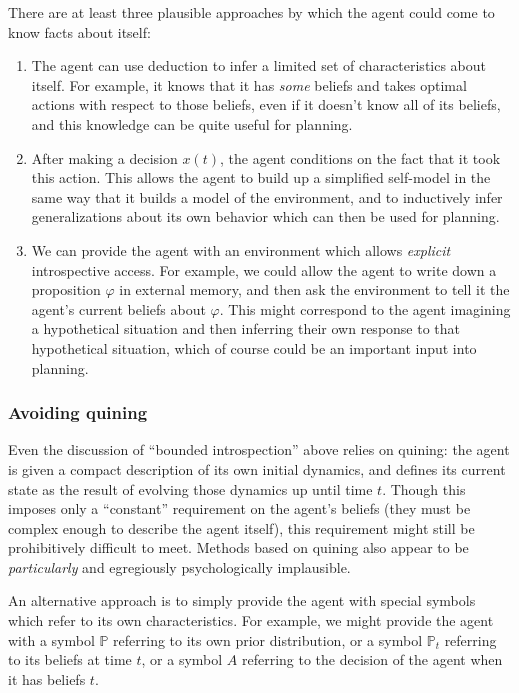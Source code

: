 \documentclass[12pt]{article}
\theoremstyle{definition}
\newcommand{\PP}{\mathbb{P}}
\newcommand{\vp}{\varphi}
\begin{document}
There are at least three plausible approaches by which the agent could come to know 
facts about itself:
\begin{enumerate}
\item The agent can use deduction to infer a limited set of characteristics
about itself. For example, it knows that it has \emph{some} beliefs
and takes optimal actions with respect to those beliefs, even if it doesn't
know all of its beliefs, and this knowledge can be quite useful for planning.
\item After making a decision $x(t)$, the agent conditions
on the fact that it took this action.
This allows the agent to build up a simplified self-model in the same way
that it builds a model of the environment,
and to inductively infer generalizations about its own behavior
which can then be used for planning.
\item We can provide the agent with an environment
which allows \emph{explicit} introspective access.
For example, we could allow the agent to write down a proposition $\vp$
in external memory, and then ask the environment to tell it
the agent's current beliefs about $\vp$.
This might correspond to the agent imagining a hypothetical situation
and then inferring their own response to that hypothetical situation,
which of course could be an important input into planning.
\end{enumerate}

\subsubsection{Avoiding quining}

Even the discussion of ``bounded introspection'' above relies on
quining: the agent is given a compact description
of its own initial dynamics,
and defines its current state as the result of evolving
those dynamics up until time $t$.
Though this imposes only a ``constant'' requirement
on the agent's beliefs (they must be complex
enough to describe the agent itself), this requirement
might still be prohibitively difficult to meet.
Methods based on quining also appear to be \emph{particularly} and egregiously
psychologically implausible.

An alternative approach is to simply provide the agent with special symbols
which refer to its own characteristics.
For example, we might provide the agent with a symbol $\PP$
referring to its own prior distribution, or a symbol $\PP_t$
referring to its beliefs at time $t$, or a symbol $A$
referring to the decision of the agent when it has beliefs $t$.
\end{document}
